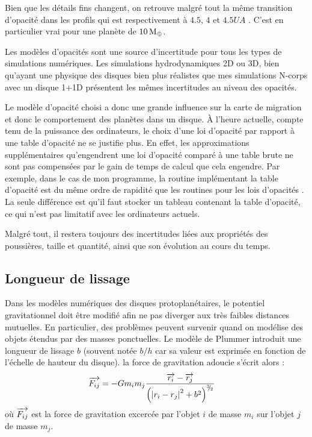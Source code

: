 Bien que les détails fins changent, on retrouve malgré tout la même transition d'opacité dans les profils \citep{bell1994FU, zhu2009nonsteady, hure2000transition} qui est respectivement à $4.5$, $4$ et $4.5\unit{UA}$ . C'est en particulier vrai pour une planète de $10\mathrm{\thinspace M_\oplus}$.

\bigskip

Les modèles d'opacités sont une source d'incertitude pour tous les types de simulations numériques. Les simulations hydrodynamiques 2D ou 3D, bien qu'ayant une physique des disques bien plus réalistes que mes simulations N-corps avec un disque 1+1D présentent les mêmes incertitudes au niveau des opacités.

Le modèle d'opacité choisi a donc une grande influence sur la carte de migration et donc le comportement des planètes dans un
disque. À l'heure actuelle, compte tenu de la puissance des ordinateurs, le choix d'une loi d'opacité par rapport à une table
d'opacité ne se justifie plus. En effet, les approximations supplémentaires qu'engendrent une loi d'opacité comparé
à une table brute ne sont pas compensées par le gain de temps de calcul que cela engendre. Par exemple, dans le cas de mon programme, la routine
implémentant la table d'opacité \cite{hure2000transition} est du même ordre de rapidité que les routines pour les lois d'opacités \citep{bell1994FU, zhu2009nonsteady, chambers2009analytic}. La seule différence est qu'il
faut stocker un tableau contenant la table d'opacité, ce qui n'est pas limitatif avec les ordinateurs actuels.

Malgré tout, il restera toujours des incertitudes liées aux propriétés des poussières, taille et quantité, ainsi que son évolution
au cours du temps. 

\subsection{Longueur de lissage}\label{sec:smoothing_effect}
Dans les modèles numériques des disques protoplanétaires, le potentiel gravitationnel doit être modifié afin ne pas diverger aux
très faibles distances mutuelles. En particulier, des problèmes peuvent survenir quand on modélise des objets étendus par des
masses ponctuelles. Le modèle de Plummer introduit une longueur de lissage $b$ (souvent notée $b/h$ car sa valeur est exprimée
en fonction de l'échelle de hauteur du disque). la force de gravitation adoucie s'écrit alors : 
\begin{align}
{\overrightarrow{F_{ij}}} &= -G m_i m_j \frac{{\overrightarrow{r_i}} - {\overrightarrow{r_j}}}{\left(\left|r_i - r_j\right|^2 + b^2\right)^{{}^{3\!\!}/ _{\!2}}}
\end{align}
où ${\overrightarrow{F_{ij}}}$ est la force de gravitation excercée par l'objet $i$ de masse $m_i$ sur l'objet $j$ de masse $m_j$.


